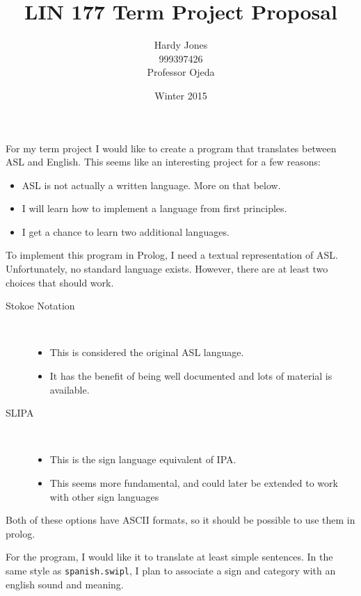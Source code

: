 \documentclass[12pt,letterpaper]{article}
\title{LIN 177 Term Project Proposal\vspace{-2ex}}
\author{Hardy Jones\\
        999397426\\
        Professor Ojeda\vspace{-2ex}}
\date{Winter 2015}
\begin{document}
  \maketitle

  For my term project I would like to create a program that translates between ASL and English.
  This seems like an interesting project for a few reasons:

  \begin{itemize}
    \item ASL is not actually a written language. More on that below.
    \item I will learn how to implement a language from first principles.
    \item I get a chance to learn two additional languages.
  \end{itemize}

  To implement this program in Prolog, I need a textual representation of ASL.
  Unfortunately, no standard language exists.
  However, there are at least two choices that should work.

  \begin{description}
    \item [Stokoe Notation] \

      \begin{itemize}
        \item This is considered the original ASL language.
        \item It has the benefit of being well documented and lots of material is available.
      \end{itemize}

    \item [SLIPA] \

      \begin{itemize}
        \item This is the sign language equivalent of IPA.
        \item This seems more fundamental, and could later be extended to work with other sign languages
      \end{itemize}
  \end{description}

  Both of these options have ASCII formats,
  so it should be possible to use them in prolog.

  For the program, I would like it to translate at least simple sentences.
  In the same style as \texttt{spanish.swipl},
  I plan to associate a sign and category with an english sound and meaning.
\end{document}
